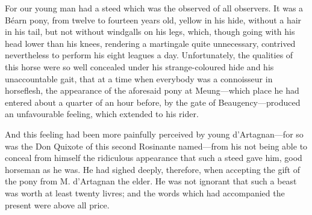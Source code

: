 For our young man had a steed which was the observed of all observers. It was a Béarn pony, from twelve to fourteen years old, yellow in his hide, without a hair in his tail, but not without windgalls on his legs, which, though going with his head lower than his knees, rendering a martingale quite unnecessary, contrived nevertheless to perform his eight leagues a day. Unfortunately, the qualities of this horse were so well concealed under his strange-coloured hide and his unaccountable gait, that at a time when everybody was a connoisseur in horseflesh, the appearance of the aforesaid pony at Meung---which place he had entered about a quarter of an hour before, by the gate of Beaugency---produced an unfavourable feeling, which extended to his rider. 

And this feeling had been more painfully perceived by young d'Artagnan---for so was the Don Quixote of this second Rosinante named---from his not being able to conceal from himself the ridiculous appearance that such a steed gave him, good horseman as he was. He had sighed deeply, therefore, when accepting the gift of the pony from M. d'Artagnan the elder. He was not ignorant that such a beast was worth at least twenty livres; and the words which had accompanied the present were above all price. 

